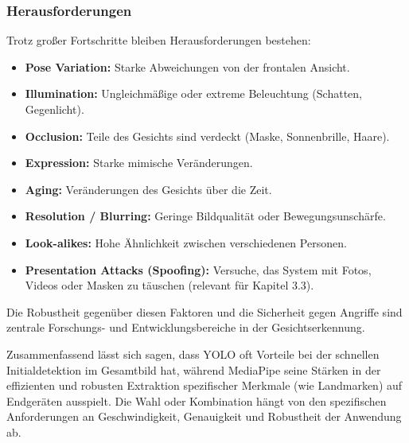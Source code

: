 \subsubsection{Herausforderungen}
Trotz großer Fortschritte bleiben Herausforderungen bestehen:

\begin{itemize}
    \item \textbf{Pose Variation:} Starke Abweichungen von der frontalen Ansicht.
    
    \item \textbf{Illumination:} Ungleichmäßige oder extreme Beleuchtung (Schatten, Gegenlicht).
    
    \item \textbf{Occlusion:} Teile des Gesichts sind verdeckt (Maske, Sonnenbrille, Haare).
    
    \item \textbf{Expression:} Starke mimische Veränderungen.
    
    \item \textbf{Aging:} Veränderungen des Gesichts über die Zeit.
    
    \item \textbf{Resolution / Blurring:} Geringe Bildqualität oder Bewegungsunschärfe.
    
    \item \textbf{Look-alikes:} Hohe Ähnlichkeit zwischen verschiedenen Personen.
    
    \item \textbf{Presentation Attacks (Spoofing):} Versuche, das System mit Fotos, Videos oder Masken zu täuschen (relevant für Kapitel 3.3).
\end{itemize}

Die Robustheit gegenüber diesen Faktoren und die Sicherheit gegen Angriffe sind zentrale Forschungs- und Entwicklungsbereiche in der Gesichtserkennung.

Zusammenfassend lässt sich sagen, dass YOLO oft Vorteile bei der schnellen Initialdetektion im Gesamtbild hat, während MediaPipe seine Stärken in der effizienten und robusten Extraktion spezifischer Merkmale (wie Landmarken) auf Endgeräten ausspielt. Die Wahl oder Kombination hängt von den spezifischen Anforderungen an Geschwindigkeit, Genauigkeit und Robustheit der Anwendung ab.
